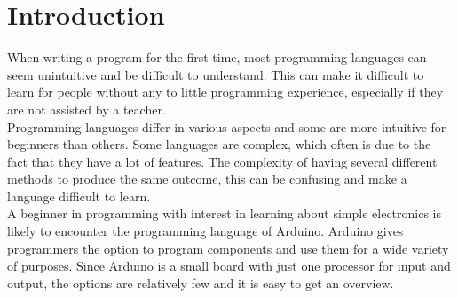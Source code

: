 \section{Introduction}
When writing a program for the first time, most programming languages can seem unintuitive and be difficult to understand. This can make it difficult to learn for people without any to little programming experience, especially if they are not assisted by a teacher.\\

Programming languages differ in various aspects and some are more intuitive for beginners than others. Some languages are complex, which often is due to the fact that they have a lot of features. The complexity of having several different methods to produce the same outcome, this can be confusing and make a language difficult to learn. \\

A beginner in programming with interest in learning about simple electronics is likely to encounter the programming language of Arduino. Arduino gives programmers the option to program components and use them for a wide variety of purposes. Since Arduino is a small board with just one processor for input and output, the options are relatively few and it is easy to get an overview. \\